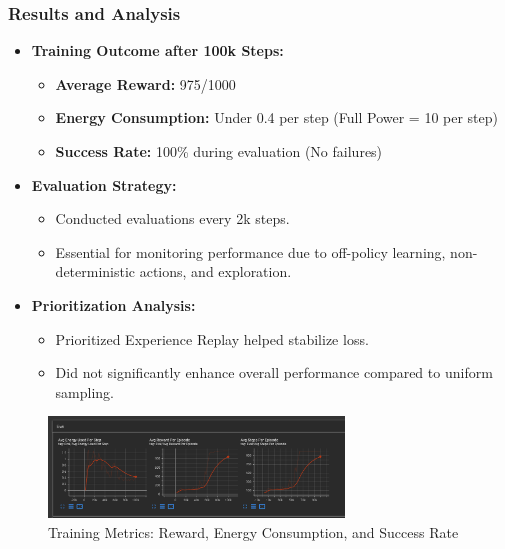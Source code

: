 \documentclass{beamer}
\begin{document}
\begin{frame}
\frametitle{Results and Analysis}
\begin{itemize}
    \item \textbf{Training Outcome after 100k Steps:}
    \begin{itemize}
        \item \textbf{Average Reward:} 975/1000
        \item \textbf{Energy Consumption:} Under 0.4 per step (Full Power = 10 per step)
        \item \textbf{Success Rate:} 100\% during evaluation (No failures)
    \end{itemize}
    \item \textbf{Evaluation Strategy:}
    \begin{itemize}
        \item Conducted evaluations every 2k steps.
        \item Essential for monitoring performance due to off-policy learning, non-deterministic actions, and exploration.
    \end{itemize}
    \item \textbf{Prioritization Analysis:}
    \begin{itemize}
        \item Prioritized Experience Replay helped stabilize loss.
        \item Did not significantly enhance overall performance compared to uniform sampling.
    \end{itemize}
\end{itemize}

\begin{figure}[ht]
    \centering
    \includegraphics[width=0.7\textwidth]{images/tensorboard_metrics.png}
    \caption{Training Metrics: Reward, Energy Consumption, and Success Rate}
    \label{fig:tensorboard_metrics}
\end{figure}
\end{frame}
\end{document}

